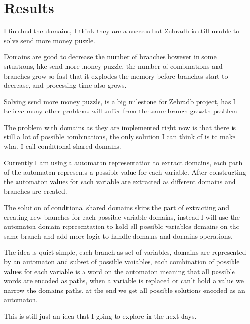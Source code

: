 \documentclass{article}
\begin{document}
\section{Results}

I finished the domains, I think they are a success but Zebradb is still unable to solve send more money puzzle.

Domains are good to decrease the number of branches however in some situations, like 
send more money puzzle, the number of combinations and branches grow so fast that it explodes the memory before
branches start to decrease, and processing time also grows. 

Solving send more money puzzle, is a big milestone for Zebradb project, has I believe many other problems will 
suffer from the same branch growth problem.

The problem with domains as they are implemented right now is that there is still a lot of possible combinations,
the only solution I can think of is to make what I call conditional shared domains.

Currently I am using a automaton representation to extract domains, each path of the automaton represents a 
possible value for each variable. After constructing the automaton values for each variable are extracted as 
different domains and branches are created.

The solution of conditional shared domains skips the part of extracting and creating new branches for 
each possible variable domains, instead I will use the automaton domain representation to hold all 
possible variables domains on the same branch and add more logic to handle domains and domains operations.

The idea is quiet simple, each branch as set of variables, domains are represented by an automaton 
and subset of possible variables, each combination of possible values for each variable is a word on the automaton
meaning that all possible words are encoded as paths, when a variable is replaced or can't hold a value we narrow 
the domains paths, at the end we get all possible solutions encoded as an automaton. 

This is still just an idea that I going to explore in the next days.
\end{document}
